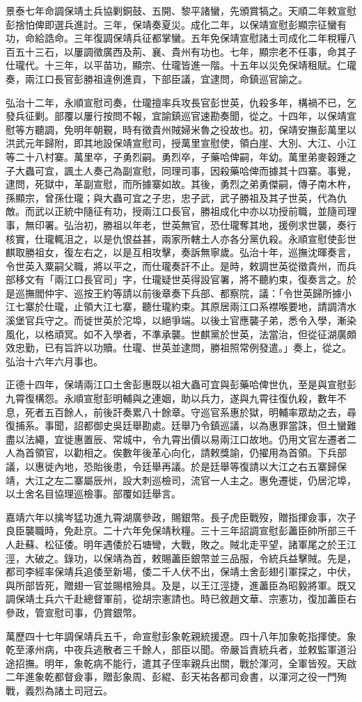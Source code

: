 \begin{pinyinscope}
景泰七年命調保靖土兵協剿銅鼓、五開、黎平諸蠻，先頒賞犒之。天順二年敕宣慰彭捨怕俾即選兵進討。三年，保靖奏夏災。成化二年，以保靖宣慰彭顯宗征蠻有功，命給誥命。三年復調保靖兵征都掌蠻。五年免保靖宣慰諸土司成化二年稅糧八百五十三石，以屢調徵廣西及荊、襄、貴州有功也。七年，顯宗老不任事，命其子仕瓏代。十三年，以平苗功，顯宗、仕瓏皆進一階。十五年以災免保靖租賦。仁瓏奏，兩江口長官彭勝祖違例進貢，下部臣議，宜逮問，命鎮巡官諭之。

弘治十二年，永順宣慰司奏，仕瓏擅率兵攻長官彭世英，仇殺多年，構禍不已，乞發兵征剿。部覆以屢行按問不報，宜諭鎮巡官速勘奏聞，從之。十四年，以保靖宣慰等方聽調，免明年朝覲，時有徵貴州賊婦米魯之役故也。初，保靖安撫彭萬里以洪武元年歸附，即其地設保靖宣慰司，授萬里宣慰使，領白崖、大別、大江、小江等二十八村寨。萬里卒，子勇烈嗣。勇烈卒，子藥哈俾嗣，年幼。萬里弟麥穀踵之子大蟲可宜，諷土人奏己為副宣慰，同理司事，因殺藥哈俾而據其十四寨。事覺，逮問，死獄中，革副宣慰，而所據寨如故。其後，勇烈之弟勇傑嗣，傳子南木杵，孫顯宗，曾孫仕瓏；與大蟲可宜之子忠，忠子武，武子勝祖及其子世英，代為仇敵。而武以正統中隨征有功，授兩江口長官，勝祖成化中亦以功授前職，並隨司理事，無印署。弘治初，勝祖以年老，世英無官，恐仕瓏奪其地，援例求世襲，奏行核實，仕瓏輒沮之，以是仇恨益甚，兩家所轄土人亦各分黨仇殺。永順宣慰使彭世麒取勝祖女，復左右之，以是互相攻擊，奏訴無寧歲。弘治十年，巡撫沈暉奏言，令世英入粟嗣父職，將以平之，而仕瓏奏訐不止。是時，敕調世英從徵貴州，而兵部移文有「兩江口長官司」字，仕瓏疑世英得設官署，將不聽約束，復奏言之。於是巡撫閻仲宇、巡按王約等請以前後章奏下兵部、都察院，議：「令世英歸所據小江七寨於仕瓏，止領大江七寨，聽仕瓏約束。其原居兩江口系襟喉要地，請調清水溪堡官兵守之。而徙世英於沱埠，以絕爭端。以後土官應襲子弟，悉令入學，漸染風化，以格頑冥。如不入學者，不準承襲。世麒黨於世英，法當治，但從征湖廣頗效忠勤，已有旨許以功贖。仕瓏、世英並逮問，勝祖照常例發遣。」奏上，從之。弘治十六年六月事也。

正德十四年，保靖兩江口土舍彭惠既以祖大蟲可宜與彭藥哈俾世仇，至是與宣慰彭九霄復構怨。永順宣慰彭明輔與之連姻，助以兵力，遂與九霄往復仇殺，數年不息，死者五百餘人，前後訐奏累八十餘章。守巡官系惠於獄，明輔率眾劫之去，尋復捕系。事聞，詔都御史吳廷舉勘處。廷舉乃令鎮巡議，以為惠罪當誅，但土蠻難盡以法繩，宜徙惠置辰、常城中，令九霄出價以易兩江口故地。仍用文官左遷者二人為首領官，以勸相之。俟數年後革心向化，請敕獎諭，仍擢用為首領。下兵部議，以惠徙內地，恐貽後患，令廷舉再議。於是廷舉等復請以大江之右五寨歸保靖，大江之左二寨屬辰州，設大刺巡檢司，流官一人主之。惠免遷徙，仍居沱埠，以土舍名目協理巡檢事。部覆如廷舉言。

嘉靖六年以擒岑猛功進九霄湖廣參政，賜銀幣。長子虎臣戰歿，贈指揮僉事，次子良臣襲職時，免赴京。二十六年免保靖秋糧。三十三年詔調宣慰彭藎臣帥所部三千人赴蘇、松征倭。明年遇倭於石塘彎，大戰，敗之。賊北走平望，諸軍尾之於王江涇，大破之。錄功，以保靖為首，敕賜藎臣銀幣並三品服，令統兵益擊賊。先是，都司李經率保靖兵追倭至新場，倭二千人伏不出，保靖土舍彭翅引軍探之，中伏，與所部皆死，贈翅一官並賜棺殮具。及是，以王江涇捷，進藎臣為昭毅將軍。既又調保靖土兵六千赴總督軍前，從胡宗憲請也。時已敘趙文華、宗憲功，復加藎臣右參政，管宣慰司事，仍賞銀幣。

萬歷四十七年調保靖兵五千，命宣慰彭象乾親統援遼。四十八年加象乾指揮使。象乾至涿州病，中夜兵逃散者三千餘人，部臣以聞。帝嚴旨責統兵者，並敕監軍道沿途招撫。明年，象乾病不能行，遣其子侄率親兵出關，戰於渾河，全軍皆歿。天啟二年進象乾都督僉事，贈彭象周、彭緄、彭天祐各都司僉書，以渾河之役一門殉戰，義烈為諸土司冠云。


\end{pinyinscope}